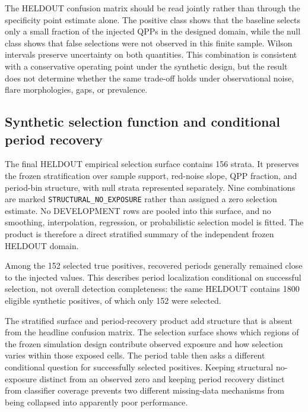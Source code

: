 \documentclass[manuscript,linenumbers]{aastex702}
\begin{document}



The HELDOUT confusion matrix should be read jointly rather than through the specificity point estimate alone. The positive class shows that the baseline selects only a small fraction of the injected QPPs in the designed domain, while the null class shows that false selections were not observed in this finite sample. Wilson intervals preserve uncertainty on both quantities. This combination is consistent with a conservative operating point under the synthetic design, but the result does not determine whether the same trade-off holds under observational noise, flare morphologies, gaps, or prevalence.

\subsection{Synthetic selection function and conditional period recovery}
The final HELDOUT empirical selection surface contains 156 strata. It preserves the frozen stratification over sample support, red-noise slope, QPP fraction, and period-bin structure, with null strata represented separately. Nine combinations are marked \texttt{STRUCTURAL\_NO\_EXPOSURE} rather than assigned a zero selection estimate. No DEVELOPMENT rows are pooled into this surface, and no smoothing, interpolation, regression, or probabilistic selection model is fitted. The product is therefore a direct stratified summary of the independent frozen HELDOUT domain.

Among the 152 selected true positives, recovered periods generally remained close to the injected values. This describes period localization conditional on successful selection, not overall detection completeness: the same HELDOUT contains 1800 eligible synthetic positives, of which only 152 were selected.

The stratified surface and period-recovery product add structure that is absent from the headline confusion matrix. The selection surface shows which regions of the frozen simulation design contribute observed exposure and how selection varies within those exposed cells. The period table then asks a different conditional question for successfully selected positives. Keeping structural no-exposure distinct from an observed zero and keeping period recovery distinct from classifier coverage prevents two different missing-data mechanisms from being collapsed into apparently poor performance.
\end{document}
